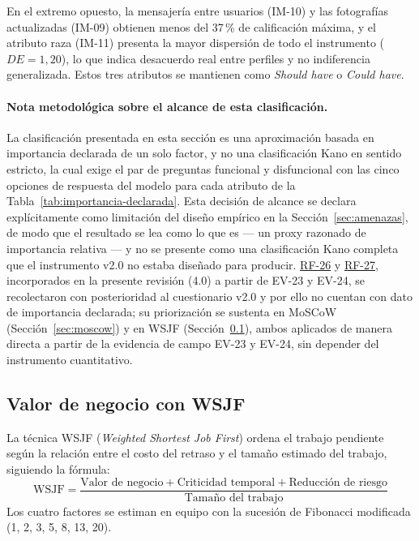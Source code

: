 \documentclass[journal,onecolumn]{IEEEtran}
\begin{document}
	En el extremo opuesto, la mensajería entre usuarios (IM-10) y las
	fotografías actualizadas (IM-09) obtienen menos del 37\,\% de calificación
	máxima, y el atributo raza (IM-11) presenta la mayor dispersión de todo el
	instrumento ($DE = 1{,}20$), lo que indica desacuerdo real entre perfiles y
	no indiferencia generalizada. Estos tres atributos se mantienen como
	\emph{Should have} o \emph{Could have}.
	
	\paragraph{Nota metodológica sobre el alcance de esta clasificación.}
	La clasificación presentada en esta sección es una aproximación basada en
	importancia declarada de un solo factor, y no una clasificación Kano en
	sentido estricto, la cual exige el par de preguntas funcional y
	disfuncional con las cinco opciones de respuesta del modelo para cada
	atributo de la Tabla~\ref{tab:importancia-declarada}. Esta decisión de
	alcance se declara explícitamente como limitación del diseño empírico en
	la Sección~\ref{sec:amenazas}, de modo que el resultado se lea como lo que
	es --- un proxy razonado de importancia relativa --- y no se presente como
	una clasificación Kano completa que el instrumento v2.0 no estaba
	diseñado para producir. \hyperref[tab:RF-26]{RF-26} y \hyperref[tab:RF-27]{RF-27}, incorporados en la presente
	revisión (4.0) a partir de EV-23 y EV-24, se recolectaron con
	posterioridad al cuestionario v2.0 y por ello no cuentan con dato de
	importancia declarada; su priorización se sustenta en MoSCoW
	(Sección~\ref{sec:moscow}) y en WSJF (Sección~\ref{sec:wsjf}), ambos
	aplicados de manera directa a partir de la evidencia de campo EV-23 y
	EV-24, sin depender del instrumento cuantitativo.
	
	\subsection{Valor de negocio con WSJF}
	\label{sec:wsjf}
	
	La técnica WSJF (\emph{Weighted Shortest Job First}) ordena el trabajo
	pendiente según la relación entre el costo del retraso y el tamaño estimado
	del trabajo, siguiendo la fórmula:
	\[
	\mathrm{WSJF} = \frac{\text{Valor de negocio} + \text{Criticidad temporal} + \text{Reducción de riesgo}}{\text{Tamaño del trabajo}}
	\]
	Los cuatro factores se estiman en equipo con la sucesión de Fibonacci
	modificada (1, 2, 3, 5, 8, 13, 20).
	
\end{document}
